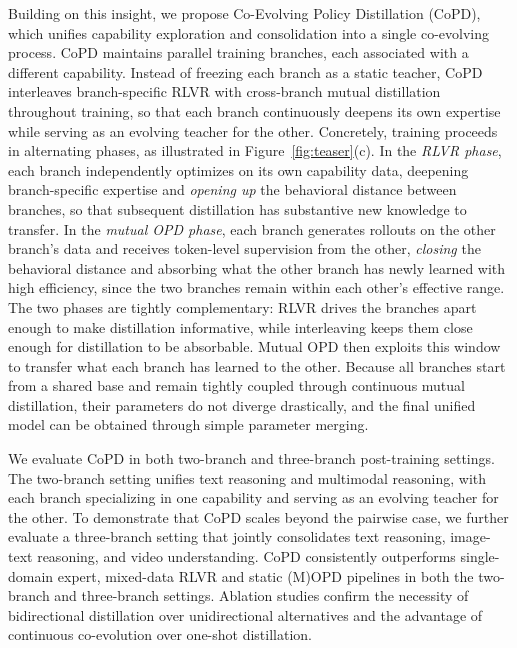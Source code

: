 Building on this insight, we propose Co-Evolving Policy Distillation (CoPD), which unifies capability exploration and consolidation into a single co-evolving process. CoPD maintains parallel training branches, each associated with a different capability. Instead of freezing each branch as a static teacher, CoPD interleaves branch-specific RLVR with cross-branch mutual distillation throughout training, so that each branch continuously deepens its own expertise while serving as an evolving teacher for the other.
Concretely, training proceeds in alternating phases, as illustrated in Figure~\ref{fig:teaser}(c). In the \textit{RLVR phase}, each branch independently optimizes on its own capability data, deepening branch-specific expertise and \textit{opening up} the behavioral distance between branches, so that subsequent distillation has substantive new knowledge to transfer. In the \textit{mutual OPD phase}, each branch generates rollouts on the other branch's data and receives token-level supervision from the other, \textit{closing} the behavioral distance and absorbing what the other branch has newly learned with high efficiency, since the two branches remain within each other's effective range. 
The two phases are tightly complementary: RLVR drives the branches apart enough to make distillation informative, while interleaving keeps them close enough for distillation to be absorbable. Mutual OPD then exploits this window to transfer what each branch has learned to the other.
Because all branches start from a shared base and remain tightly coupled through continuous mutual distillation, their parameters do not diverge drastically, and the final unified model can be obtained through simple parameter merging.


We evaluate CoPD in both two-branch and three-branch post-training settings. The two-branch setting unifies text reasoning and multimodal reasoning, with each branch specializing in one capability and serving as an evolving teacher for the other. To demonstrate that CoPD scales beyond the pairwise case, we further evaluate a three-branch setting that jointly consolidates text reasoning, image-text reasoning, and video understanding.
CoPD consistently outperforms single-domain expert, mixed-data RLVR and static (M)OPD pipelines in both the two-branch and three-branch settings. Ablation studies confirm the necessity of bidirectional distillation over unidirectional alternatives and the advantage of continuous co-evolution over one-shot distillation.

